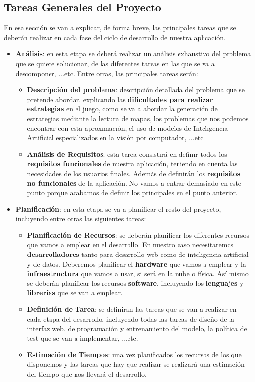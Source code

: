 \subsection{Tareas Generales del Proyecto}
En esa sección se van a explicar, de forma breve, las principales tareas que se deberán realizar en cada fase del ciclo de desarrollo de nuestra aplicación.    
\begin{itemize}
	\item \textbf{Análisis}: en esta etapa se deberá realizar un análisis exhaustivo del problema que se quiere solucionar, de las diferentes tareas en las que se va a descomponer, ...etc. Entre otras, las principales tareas serán:
	\begin{itemize}
		\item \textbf{Descripción del problema}: descripción detallada del problema que se pretende abordar, explicando las \textbf{dificultades para realizar estrategias} en el juego, como se va a abordar la generación de estrategias mediante la lectura de mapas, los problemas que nos podemos encontrar con esta aproximación, el uso de modelos de Inteligencia Artificial especializados en la visión por computador, ...etc.
		\item \textbf{Análisis de Requisitos}: esta tarea consistirá en definir todos los \textbf{requisitos funcionales} de nuestra aplicación, teniendo en cuenta las necesidades de los usuarios finales. Además de definirán los \textbf{requisitos no funcionales} de la aplicación. No vamos a entrar demasiado en este punto porque acabamos de definir los principales en el punto anterior.
	\end{itemize}
	
	\item \textbf{Planificación}: en esta etapa se va a planificar el resto del proyecto, incluyendo entre otras las siguientes tareas:
	\begin{itemize}
		\item \textbf{Planificación de Recursos}: se deberán planificar los diferentes recursos que vamos a emplear en el desarrollo. En nuestro caso necesitaremos \textbf{desarrolladores} tanto para desarrollo web como de inteligencia artificial y de datos. Deberemos planificar el \textbf{hardware} que vamos a emplear y la \textbf{infraestructura} que vamos a usar, si será en la nube o física. Así mismo se deberán planificar los recursos \textbf{software}, incluyendo los \textbf{lenguajes} y \textbf{librerías} que se van a emplear.
		\item \textbf{Definición de Tarea}: se definirán las tareas que se van a realizar en cada etapa del desarrollo, incluyendo todas las tareas de diseño de la interfaz web, de programación y entrenamiento del modelo, la política de test que se van a implementar, ...etc.
		\item \textbf{Estimación de Tiempos}: una vez planificados los recursos de los que disponemos y las tareas que hay que realizar se realizará una estimación del tiempo que nos llevará el desarrollo.		
	\end{itemize}
	

\end{itemize}
